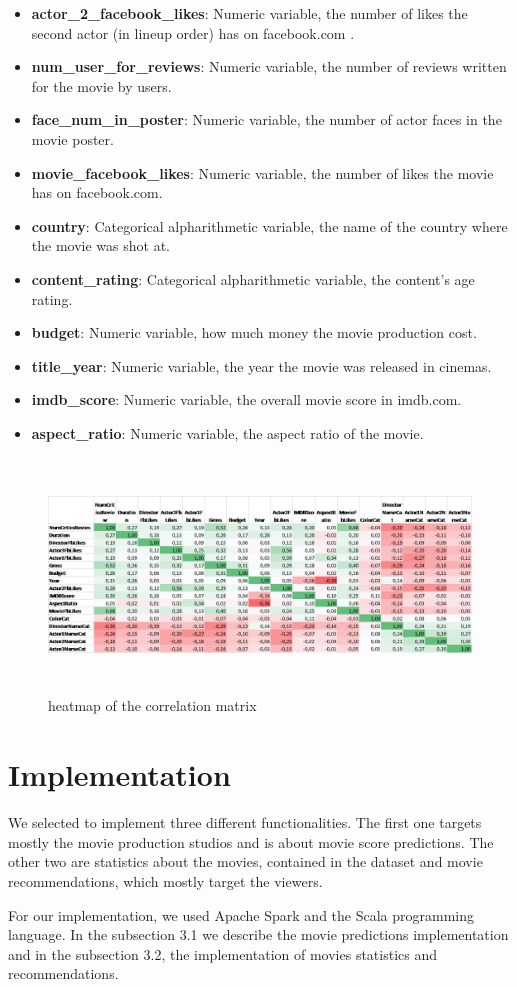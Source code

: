 \documentclass[letterpaper,twocolumn,10pt]{article}
\begin{document}
\begin{itemize}
\item \textbf{actor\_2\_facebook\_likes}: Numeric variable, the number of likes the second actor (in lineup order) has on facebook.com . 
\item \textbf{num\_user\_for\_reviews}: Numeric variable, the number of reviews written for the movie by users.
\item \textbf{face\_num\_in\_poster}: Numeric variable, the number of actor faces in the movie poster.
\item \textbf{movie\_facebook\_likes}: Numeric variable, the number of likes the movie has on facebook.com.
\item \textbf{country}: Categorical alpharithmetic variable, the name of the country where the movie was shot at.
\item \textbf{content\_rating}:  Categorical alpharithmetic variable, the content's age rating.
\item \textbf{budget}: Numeric variable, how much money the movie production cost.
\item \textbf{title\_year}: Numeric variable, the year the movie was released in cinemas.
\item \textbf{imdb\_score}: Numeric variable, the overall movie score in imdb.com.
\item \textbf{aspect\_ratio}: Numeric variable, the aspect ratio of the movie.
\end{itemize}

\begin{figure}	
	\includegraphics[width = \textwidth,height=6.2cm]{correlation_matrix_image}
	\caption{heatmap of the correlation matrix}
\end{figure}

\section{Implementation}
We selected to implement three different functionalities. The first one targets mostly the movie production studios and is about movie score predictions. The other two are statistics about the movies, contained in the dataset and movie recommendations, which mostly target the viewers. 
\par For our implementation, we used Apache Spark\cite{spark} and the Scala programming language\cite{scala}. In the subsection 3.1 we describe the movie predictions implementation and in the subsection 3.2, the implementation of movies statistics and recommendations.
\end{document}

